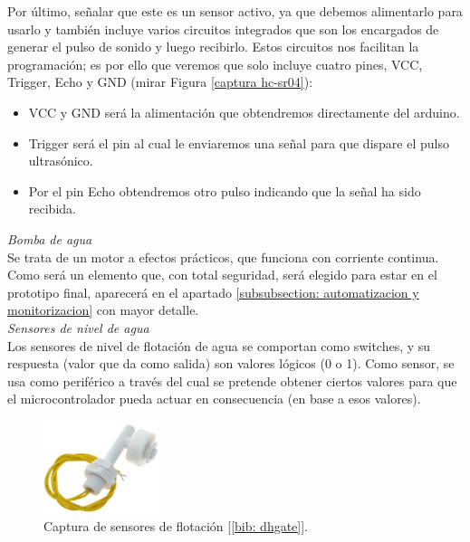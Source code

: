 \documentclass[12pt]{article}
\begin{document}
	\noindent Por último, señalar que este es un sensor activo, ya que debemos alimentarlo para usarlo y también incluye varios circuitos integrados que son los encargados de generar el pulso de sonido y luego recibirlo. Estos circuitos nos facilitan la programación; es por ello que veremos que solo incluye cuatro pines, VCC, Trigger, Echo y GND (mirar Figura \ref{captura hc-sr04}):
	
	\begin{itemize}
		\item VCC y GND será la alimentación que obtendremos directamente del arduino. 
		\item Trigger será el pin al cual le enviaremos una señal para que dispare el pulso ultrasónico. 
		\item Por el pin Echo obtendremos otro pulso indicando que la señal ha sido recibida.
	\end{itemize}
	
	\noindent \textit{Bomba de agua} \\
	
	\noindent Se trata de un motor a efectos prácticos, que funciona con corriente continua. Como será un elemento que, con total seguridad, será elegido para estar en el prototipo final, aparecerá en el apartado \ref{subsubsection: automatizacion y monitorizacion} con mayor detalle. \\
	
	\noindent \textit{Sensores de nivel de agua} \\
	
	\noindent Los sensores de nivel de flotación de agua se comportan como switches, y su respuesta (valor que da como salida) son valores lógicos (0 o 1). Como sensor, se usa como periférico a través del cual se pretende obtener ciertos valores para que el microcontrolador pueda actuar en consecuencia (en base a esos valores).\\
	
	\begin{figure}[h!]
			\begin{center}
				\includegraphics[width=0.3\textwidth]{img/sensor_flotacion.png}
				\caption{Captura de sensores de flotación [\ref{bib: dhgate}].}
				\label{Sensor de flotación}
			\end{center}
	\end{figure}
	
\end{document}
